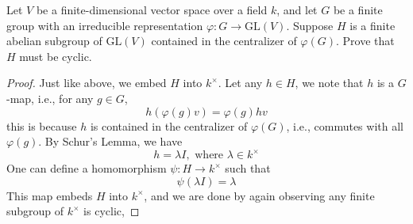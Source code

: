 \begin{prob}[S2005-Q6]
    Let \( V \) be a finite-dimensional vector space over a field \( k \), and let \( G \) be a finite group with an irreducible representation \( \varphi \colon G \to \mathrm{GL}(V) \). Suppose \( H \) is a finite abelian subgroup of \( \mathrm{GL}(V) \) contained in the centralizer of \( \varphi(G) \). Prove that \( H \) must be cyclic.
\end{prob}
\begin{proof}
    Just like above, we embed $H$ into $k^\times$. Let any $h\in H$, we note that $h$ is a $G$-map, i.e., for any $g\in G$, 
    \begin{equation*}
        h(\varphi(g)v)=\varphi(g)hv
    \end{equation*}
    this is because $h$ is contained in the centralizer of $\varphi(G)$, i.e., commutes with all $\varphi(g)$. By Schur's Lemma, we have 
    \begin{equation*}
        h=\lambda I, \text{ where }\lambda\in k^\times
    \end{equation*}
    One can define a homomorphism $\psi: H\to k^\times$ such that 
    \begin{equation*}
        \psi(\lambda I)=\lambda
    \end{equation*}
    This map embeds $H$ into $k^\times$, and we are done by again observing any finite subgroup of $k^\times$ is cyclic, 
\end{proof}






